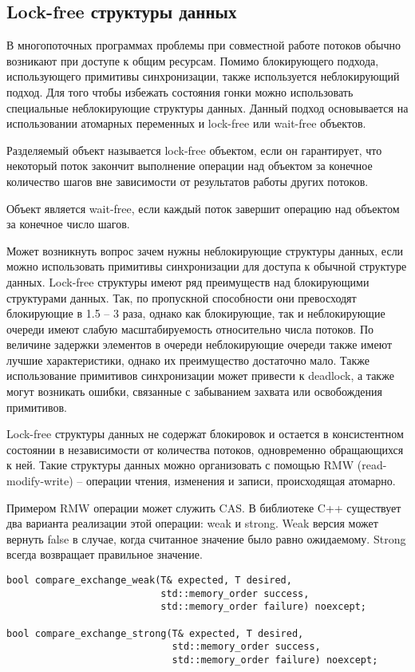 \subsection{Lock-free структуры данных}
\label{lockfree:section}
	
В многопоточных программах проблемы при совместной работе потоков обычно возникают при доступе к общим ресурсам. Помимо блокирующего подхода, использующего  примитивы синхронизации, также используется неблокирующий подход. Для того чтобы избежать состояния гонки можно использовать специальные неблокирующие структуры данных. Данный подход основывается на использовании атомарных переменных и lock-free или wait-free объектов.
	
Разделяемый объект называется lock-free объектом, если он гарантирует, что некоторый поток закончит выполнение операции над объектом за конечное количество шагов вне зависимости от результатов работы других потоков.
	
Объект является wait-free, если каждый поток завершит операцию над объектом за конечное число шагов.
	
Может возникнуть вопрос зачем нужны неблокирующие структуры данных, если можно использовать примитивы синхронизации для доступа к обычной структуре данных. Lock-free структуры имеют ряд преимуществ над блокирующими структурами данных. Так, по пропускной способности они превосходят блокирующие в 1.5 -- 3 раза, однако как блокирующие, так и неблокирующие очереди имеют слабую масштабируемость относительно числа потоков. По величине задержки элементов в очереди неблокирующие очереди также имеют лучшие характеристики, однако их преимущество достаточно мало. Также использование примитивов синхронизации может привести к deadlock, а также могут возникать ошибки, связанные с забыванием захвата или освобождения примитивов.
	
Lock-free структуры данных не содержат блокировок и остается в консистентном состоянии в независимости от количества потоков, одновременно обращающихся к ней. Такие структуры данных можно организовать с помощью RMW (read-modify-write) -- операции чтения, изменения и записи, происходящая атомарно.
	
Примером RMW операции может служить CAS. В библиотеке C++ существует два варианта реализации этой операции: weak и strong. Weak версия может вернуть false в случае, когда считанное значение было равно ожидаемому. Strong всегда возвращает правильное значение.

\begin{verbatim}
bool compare_exchange_weak(T& expected, T desired, 
                           std::memory_order success, 
                           std::memory_order failure) noexcept;

bool compare_exchange_strong(T& expected, T desired, 
                             std::memory_order success, 
                             std::memory_order failure) noexcept;
\end{verbatim}

